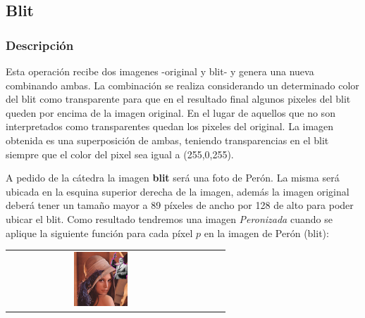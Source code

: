 \subsection{Blit}

\subsubsection{Descripción}

Esta operación recibe dos imagenes -original y blit- y genera una nueva combinando ambas. La combinación se realiza considerando un determinado color del blit como transparente para que en el resultado final algunos pixeles del blit queden por encima de la imagen original. En el lugar de aquellos que no son interpretados como transparentes quedan los pixeles del original. La imagen obtenida es una superposición de ambas, teniendo transparencias en el blit siempre que el color del pixel sea igual a (255,0,255).


\begin{multicols}{2}
A pedido de la cátedra la imagen \textbf{blit} ser\'a una foto de Per\'on. La misma será ubicada en la esquina superior derecha de la imagen, además la imagen original deberá tener un tamaño mayor a 89 píxeles de ancho por 128 de alto para poder ubicar el blit. Como resultado tendremos una imagen \textit{Peronizada} cuando se aplique la siguiente función para cada p\'ixel $p$ en la imagen de Per\'on (blit):\\
\begin{center}
	\begin{tabular}{cccc}
	  \includegraphics[width=0.3\textwidth]{imagenes/lenaBLIT.jpg} \\
	\end{tabular}
   \end{center}
\end{multicols}

